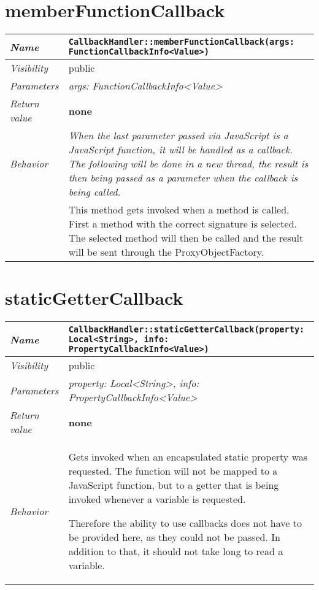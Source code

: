  \section{memberFunctionCallback}
\begin{longtable}{p{3cm} @{\hskip 1cm} p{12cm}}
 \hline
\textit{Name} & \texttt{CallbackHandler::memberFunctionCallback(args: FunctionCallbackInfo<Value>)}\\
\hline
 \textit{Visibility} & public\\
\hline
\textit{Parameters} & \textit{args: FunctionCallbackInfo<Value>}\\
\hline
\textit{Return value} & \textbf{none}\\
  \hline
 \textit{Behavior} & \textit{When the last parameter passed via JavaScript is a JavaScript function, it will be handled as a callback. The following will be done in a new thread, the result is then being passed as a parameter when the callback is being called.}\\

 & This method gets invoked when a method is called. First a method with the correct signature is selected.
 The selected method will then be called and the result will be sent through the ProxyObjectFactory. \\
\hline
\end{longtable} \pagebreak
 \section{staticGetterCallback}
\begin{longtable}{p{3cm} @{\hskip 1cm} p{12cm}}
 \hline
\textit{Name} & \texttt{CallbackHandler::staticGetterCallback(property: Local<String>, info: PropertyCallbackInfo<Value>)}\\
\hline
 \textit{Visibility} & public\\
\hline
\textit{Parameters} & \textit{property: Local<String>, info: PropertyCallbackInfo<Value>}\\
\hline
\textit{Return value} & \textbf{none}\\
  \hline
 \textit{Behavior} &  Gets invoked when an encapsulated static property was requested. The function will not be mapped to a JavaScript function, but to a getter that is being invoked whenever a variable is requested.

 Therefore the ability to use callbacks does not have to be provided here, as they could not be passed. In addition to that, it should not take long to read a variable.\\
\hline
\end{longtable}
